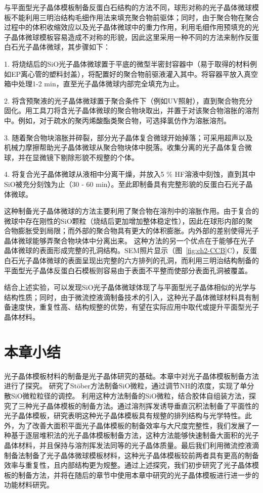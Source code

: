 与平面型光子晶体模板制备反蛋白石结构的方法不同，球形对称的光子晶体微球模板不能利用三明治结构毛细作用法来填充聚合物前驱体；同时，由于聚合物在聚合过程中的体积收缩效应以及光子晶体微球中的重力作用，利用毛细作用预填充的光子晶体微球模板容易造成不对称的形貌，因此这里采用一种不同的方法来制作反蛋白石光子晶体微球，其步骤如下：

1. 将烧结后的SiO光子晶体微球置于平底的微型半密封容器中（易于取得的材料例如EP离心管的塑料封盖），将配置好的聚合物前驱液灌入其中。将容器平放入真空箱中处理1-2 min，直至光子晶体微球内部完全填充为止。

2. 将含预聚液的光子晶体微球置于聚合条件下（例如UV照射），直到聚合物充分固化。用工具刀将含光子晶体微球的聚合物块取出，并置于对该聚合物溶胀的溶剂中。例如，对于疏水的聚丙烯酸酯类聚合物，可选择氯仿作为溶胀溶剂。

3. 随着聚合物块溶胀并碎裂，部分光子晶体复合微球开始掉落；可采用超声以及机械力摩擦帮助光子晶体微球从聚合物块体中脱落。收集分离的光子晶体复合微球，并在显微镜下剔除形貌不规整的个体。

4. 将复合光子晶体微球从液相中分离干燥，并放入5 \% HF溶液中刻蚀，直到其中SiO被充分刻蚀为止（30 - 60 min）。至此即制备具有完整形貌的反蛋白石光子晶体微球。

这种制备光子晶体微球的方法主要利用了聚合物在溶剂中的溶胀作用。由于复合的微球中存在刚性的SiO颗粒（烧结后更加增加整体稳定性），因此在球形内部的聚合物膨胀受到局限；而外部的聚合物具有更大的体积膨胀。内外部的差别使得光子晶体微球能够弄聚合物块体中分离出来。
这种方法的另一个优点在于能够在光子晶体微球的表面形成完整的孔洞结构。SEM照片显示（图~\ref{fig:ch2-CCB}C），反蛋白石光子晶体微球的表面呈现出完整的六方排列的孔洞，而利用三明治结构制备的平面型光子晶体反蛋白石模板则容易由于表面不平整而使部分表面孔洞被覆盖。

结合上述实验，可以发现SiO光子晶体微球体现了与平面型光子晶体相似的光学与结构性质；同时，由于微流控液滴制备技术的引入，这种光子晶体微球材料具有制备速度快，重复性高、结构规整的优势，有望在实际应用中取代或提升平面型光子晶体材料。

\section{本章小结}

光子晶体模板材料的制备是光子晶体研究的基础。本章中对光子晶体模板制备方法进行了探究。
研究了Stöber方法制备SiO微粒，通过调节NH的浓度，实现了单分散SiO微粒粒径的调控。
利用这种方法制备的SiO微粒，结合胶体自组装方法，探究了三种光子晶体模板的制备方法。通过溶剂挥发诱导垂直沉积法制备了平面性的光子晶体模板，研究表明这种光子晶体模板具有规整的排列结构与光学特性。此外，为了改善大面积平面光子晶体模板的制备效率与大尺度完整性，我们发展了一种基于逐层堆积法的光子晶体模板制备方法，这种方法能够快速制备大面积的光子晶体材料，并且保持与溶剂挥发法同等的光子晶体质量。最后我们利用微流控液滴制备法制备了光子晶体微球模板材料，这种光子晶体模板较前两者具有更高的制备效率与重复性，且内部结构更为规整。通过上述探究，我们初步研究了光子晶体模板的制备方法，并将在随后的章节中使用本章中研究的光子晶体模板进行进一步的功能材料研究。

